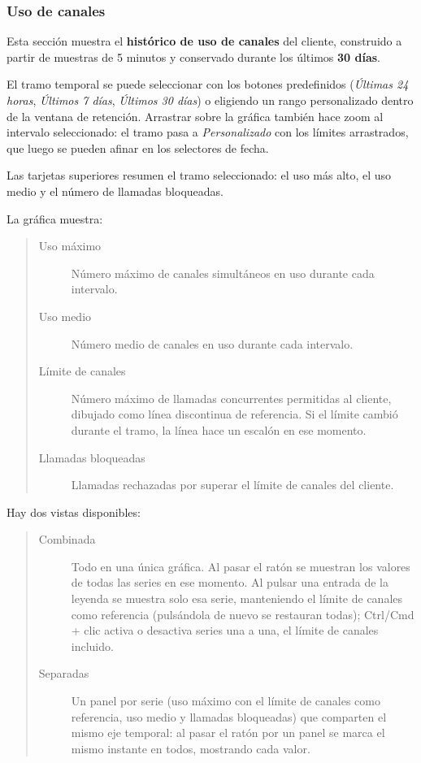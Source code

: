 \documentclass[letterpaper,10pt,spanish]{sphinxmanual}
\begin{document}
\subsubsection{Uso de canales}
\label{administration_portal/client/retail/calls/channel_usage:channel-usage}\label{administration_portal/client/retail/calls/channel_usage::doc}
Esta sección muestra el \textbf{histórico de uso de canales} del cliente, construido a partir de muestras de 5 minutos y conservado durante los últimos \textbf{30 días}.

El tramo temporal se puede seleccionar con los botones predefinidos (\emph{Últimas 24 horas}, \emph{Últimos 7 días}, \emph{Últimos 30 días}) o eligiendo un rango personalizado dentro de la ventana de retención. Arrastrar sobre la gráfica también hace zoom al intervalo seleccionado: el tramo pasa a \emph{Personalizado} con los límites arrastrados, que luego se pueden afinar en los selectores de fecha.

Las tarjetas superiores resumen el tramo seleccionado: el uso más alto, el uso medio y el número de llamadas bloqueadas.

La gráfica muestra:
\begin{quote}
\begin{description}
\item[{Uso máximo}] \leavevmode
Número máximo de canales simultáneos en uso durante cada intervalo.

\item[{Uso medio}] \leavevmode
Número medio de canales en uso durante cada intervalo.

\item[{Límite de canales}] \leavevmode
Número máximo de llamadas concurrentes permitidas al cliente, dibujado como línea discontinua de referencia. Si el límite cambió durante el tramo, la línea hace un escalón en ese momento.

\item[{Llamadas bloqueadas}] \leavevmode
Llamadas rechazadas por superar el límite de canales del cliente.

\end{description}
\end{quote}

Hay dos vistas disponibles:
\begin{quote}
\begin{description}
\item[{Combinada}] \leavevmode
Todo en una única gráfica. Al pasar el ratón se muestran los valores de todas las series en ese momento. Al pulsar una entrada de la leyenda se muestra solo esa serie, manteniendo el límite de canales como referencia (pulsándola de nuevo se restauran todas); Ctrl/Cmd + clic activa o desactiva series una a una, el límite de canales incluido.

\item[{Separadas}] \leavevmode
Un panel por serie (uso máximo con el límite de canales como referencia, uso medio y llamadas bloqueadas) que comparten el mismo eje temporal: al pasar el ratón por un panel se marca el mismo instante en todos, mostrando cada valor.

\end{description}
\end{quote}
\end{document}
